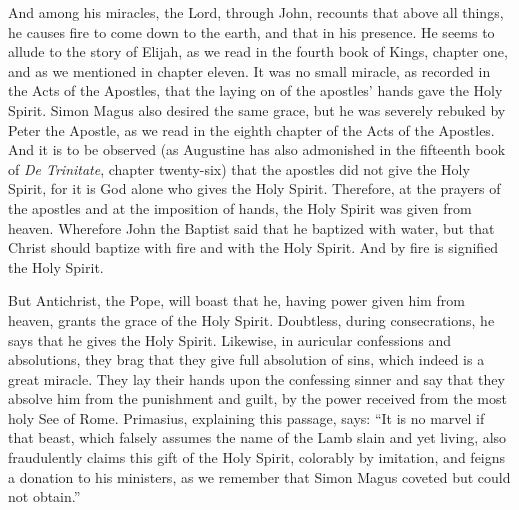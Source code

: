 And among his miracles, the Lord, through John, recounts that above all things, he causes fire to come down to the earth, and that in his presence. He seems to allude to the story of Elijah, as we read in the fourth book of Kings, chapter one, and as we mentioned in chapter eleven. It was no small miracle, as recorded in the Acts of the Apostles, that the laying on of the apostles’ hands gave the Holy Spirit. Simon Magus also desired the same grace, but he was severely rebuked by Peter the Apostle, as we read in the eighth chapter of the Acts of the Apostles. And it is to be observed (as Augustine has also admonished in the fifteenth book of \textit{De Trinitate}, chapter twenty-six) that the apostles did not give the Holy Spirit, for it is God alone who gives the Holy Spirit. Therefore, at the prayers of the apostles and at the imposition of hands, the Holy Spirit was given from heaven. Wherefore John the Baptist said that he baptized with water, but that Christ should baptize with fire and with the Holy Spirit. And by fire is signified the Holy Spirit.

But Antichrist, the Pope, will boast that he, having power given him from heaven, grants the grace of the Holy Spirit. Doubtless, during consecrations, he says that he gives the Holy Spirit. Likewise, in auricular confessions and absolutions, they brag that they give full absolution of sins, which indeed is a great miracle. They lay their hands upon the confessing sinner and say that they absolve him from the punishment and guilt, by the power received from the most holy See of Rome. Primasius, explaining this passage, says: “It is no marvel if that beast, which falsely assumes the name of the Lamb slain and yet living, also fraudulently claims this gift of the Holy Spirit, colorably by imitation, and feigns a donation to his ministers, as we remember that Simon Magus coveted but could not obtain.”

